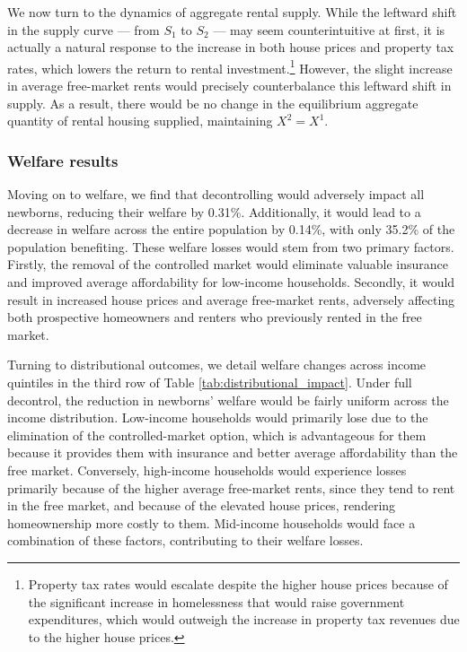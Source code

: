\documentclass[parskip=full]{article}
\begin{document}
We now turn to the dynamics of aggregate rental supply. While the leftward shift in the supply curve — from $S_1$ to $S_2$ — may seem counterintuitive at first, it is actually a natural response to the increase in both house prices and property tax rates, which lowers the return to rental investment.\footnote{Property tax rates would escalate despite the higher house prices because of the significant increase in homelessness that would raise government expenditures, which would outweigh the increase in property tax revenues due to the higher house prices.} However, the slight increase in average free-market rents would precisely counterbalance this leftward shift in supply. As a result, there would be no change in the equilibrium aggregate quantity of rental housing supplied, maintaining $X^{2}=X^{1}$.

\subsubsection{Welfare results}

Moving on to welfare, we find that decontrolling would adversely impact all newborns, reducing their welfare by 0.31\%. Additionally, it would lead to a decrease in welfare across the entire population by 0.14\%, with only 35.2\% of the population benefiting. These welfare losses would stem from two primary factors. Firstly, the removal of the controlled market would eliminate valuable insurance and improved average affordability for low-income households. Secondly, it would result in increased house prices and average free-market rents, adversely affecting both prospective homeowners and renters who previously rented in the free market.

Turning to distributional outcomes, we detail welfare changes across income quintiles in the third row of Table \ref{tab:distributional_impact}. Under full decontrol, the reduction in newborns' welfare would be fairly uniform across the income distribution. Low-income households would primarily lose due to the elimination of the controlled-market option, which is advantageous for them because it provides them with insurance and better average affordability than the free market. Conversely, high-income households would experience losses primarily because of the higher average free-market rents, since they tend to rent in the free market, and because of the elevated house prices, rendering homeownership more costly to them. Mid-income households would face a combination of these factors, contributing to their welfare losses.
\end{document}
